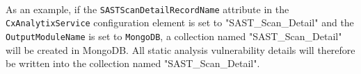 \noindent\\As an example, if the \texttt{SASTScanDetailRecordName} attribute in the \texttt{CxAnalytixService} configuration element is set to
"SAST\_Scan\_Detail" and the \texttt{OutputModuleName} is set to \texttt{MongoDB}, a collection named "SAST\_Scan\_Detail" will be created in MongoDB.
All static analysis vulnerability details will therefore be written into the collection named "SAST\_Scan\_Detail".






